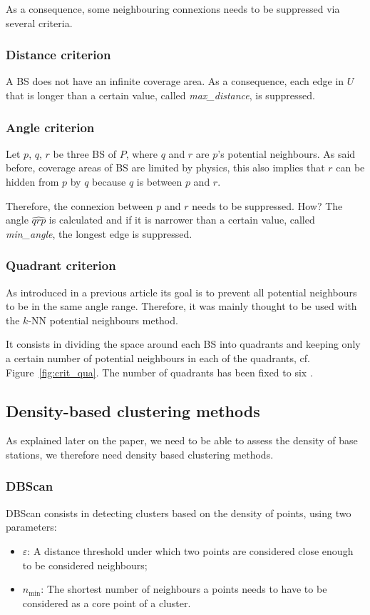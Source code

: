 \documentclass[lettersize,journal,english]{IEEEtran}
\begin{document}
        As a consequence, some neighbouring connexions needs to be suppressed via several criteria\cite{patent_neighs}.
        \subsubsection{Distance criterion}
            A BS does not have an infinite coverage area.
            As a consequence, each edge in $U$ that is longer than a certain value, called \emph{max\_distance}, is suppressed.

        \subsubsection{Angle criterion}
            Let $p$, $q$, $r$ be three BS of $P$, where $q$ and $r$ are $p$'s potential neighbours. As said before, coverage areas of BS are limited by physics, this also implies that $r$ can be \og hidden\fg{} from $p$ by $q$ because $q$ is between $p$ and $r$.

            Therefore, the connexion between $p$ and $r$ needs to be suppressed. How? The angle $\widehat{qrp}$ is calculated and if it is narrower than a certain value, called \emph{min\_angle}, the longest edge is suppressed.

        \subsubsection{Quadrant criterion}
            As introduced in a previous article \cite{10201211} its goal is to prevent all potential neighbours to be in the same angle range. Therefore, it was mainly thought to be used with the $k$-NN potential neighbours method.

            It consists in dividing the space around each BS into quadrants and keeping only a certain number of potential neighbours in each of the quadrants, cf. Figure~\ref{fig:crit_qua}.
            The number of quadrants has been fixed to six \cite{art_del_paq}.

    \subsection{Density-based clustering methods}
        As explained later on the paper, we need to be able to assess the density of base stations, we therefore need density based clustering methods.
        \subsubsection{DBScan}
            DBScan consists in detecting clusters based on the density of points, using two parameters:
            \begin{itemize}
                \item $\varepsilon$: A distance threshold under which two points are considered close enough to be considered neighbours;   
                \item $n_{\text{min}}$: The shortest number of neighbours a points needs to have to be considered as a core point of a cluster.
            \end{itemize}
\end{document}
